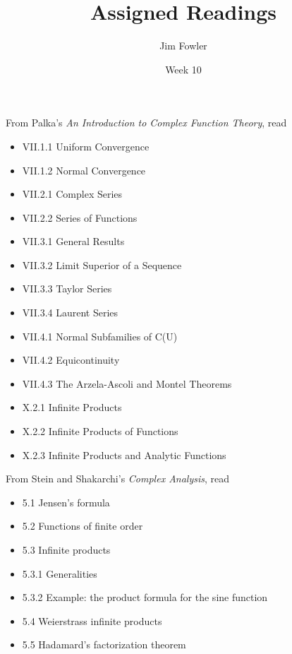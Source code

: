 \documentclass{homework}
\author{Jim Fowler}
\title{Assigned Readings}
\date{Week 10}
\begin{document}
\maketitle


From Palka's \textit{An Introduction to Complex Function Theory}, read
\begin{itemize}
\item VII.1.1 Uniform Convergence
\item VII.1.2 Normal Convergence
\item VII.2.1 Complex Series
\item VII.2.2 Series of Functions
\item VII.3.1 General Results
\item VII.3.2 Limit Superior of a Sequence
\item VII.3.3 Taylor Series
\item VII.3.4 Laurent Series
\item VII.4.1 Normal Subfamilies of C(U)
\item VII.4.2 Equicontinuity
\item VII.4.3 The Arzela-Ascoli and Montel Theorems
\item X.2.1 Infinite Products
\item X.2.2 Infinite Products of Functions
\item X.2.3 Infinite Products and Analytic Functions
\end{itemize}

From Stein and Shakarchi's \textit{Complex Analysis}, read
\begin{itemize}
\item 5.1 Jensen's formula
\item 5.2 Functions of finite order
\item 5.3 Infinite products
\item 5.3.1 Generalities
\item 5.3.2 Example: the product formula for the sine function
\item 5.4 Weierstrass infinite products
\item 5.5 Hadamard's factorization theorem
\end{itemize}
\end{document}
